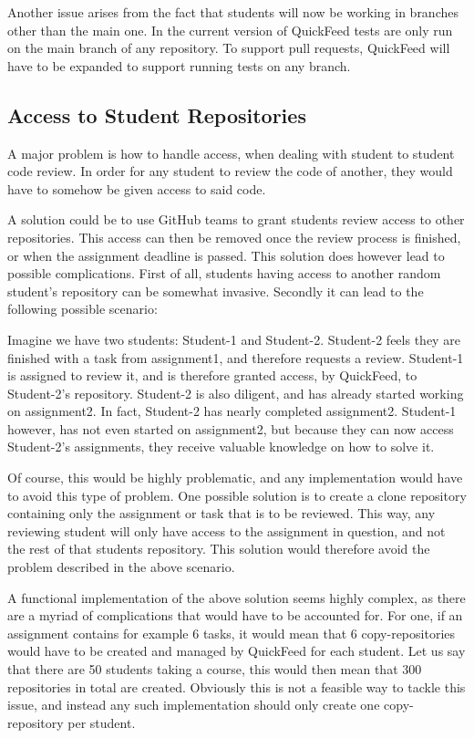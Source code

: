 Another issue arises from the fact that students will now be working in branches other than the main one.
In the current version of QuickFeed tests are only run on the main branch of any repository.
To support pull requests, QuickFeed will have to be expanded to support running tests on any branch.

\subsection{Access to Student Repositories}

A major problem is how to handle access, when dealing with student to student code review.
In order for any student to review the code of another, they would have to somehow be given access to said code.

A solution could be to use GitHub teams to grant students review access to other repositories.
This access can then be removed once the review process is finished, or when the assignment deadline is passed.
This solution does however lead to possible complications.
First of all, students having access to another random student's repository can be somewhat invasive.
Secondly it can lead to the following possible scenario:

Imagine we have two students: Student-1 and Student-2.
Student-2 feels they are finished with a task from assignment1, and therefore requests a review.
Student-1 is assigned to review it, and is therefore granted access, by QuickFeed, to Student-2's repository.
Student-2 is also diligent, and has already started working on assignment2.
In fact, Student-2 has nearly completed assignment2.
Student-1 however, has not even started on assignment2, but because they can now access Student-2's assignments, they receive valuable knowledge on how to solve it.

Of course, this would be highly problematic, and any implementation would have to avoid this type of problem.
One possible solution is to create a clone repository containing only the assignment or task that is to be reviewed. 
This way, any reviewing student will only have access to the assignment in question, and not the rest of that students repository.
This solution would therefore avoid the problem described in the above scenario.

A functional implementation of the above solution seems highly complex, as there are a myriad of complications that would have to be accounted for.
For one, if an assignment contains for example 6 tasks, it would mean that 6 copy-repositories would have to be created and managed by QuickFeed for each student.
Let us say that there are 50 students taking a course, this would then mean that 300 repositories in total are created.
Obviously this is not a feasible way to tackle this issue, and instead any such implementation should only create one copy-repository per student.


